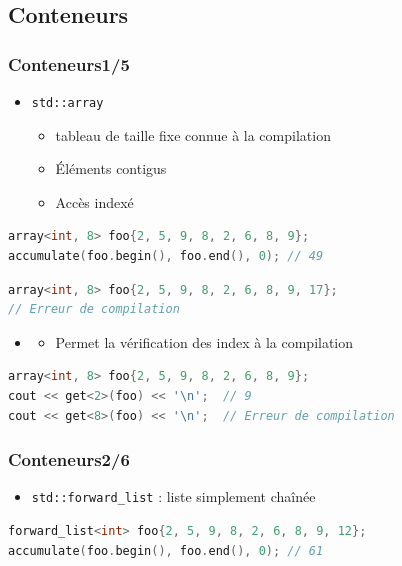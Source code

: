 \documentclass[C++.tex]{subfiles}
\begin{document}
\subsection*{Conteneurs}
\begin{frame}[fragile]
	\frametitle{Conteneurs\titlehfill{}1/5}
	\begin{itemize}
		\item \lstinline|std::array|
		\begin{itemize}
			\item tableau de taille fixe connue à la compilation
			\item Éléments contigus
			\item Accès indexé
		\end{itemize}
	\end{itemize}

	\begin{lstlisting}[language=C++]
array<int, 8> foo{2, 5, 9, 8, 2, 6, 8, 9};
accumulate(foo.begin(), foo.end(), 0); // 49\end{lstlisting}

	\begin{lstlisting}[language=C++]
array<int, 8> foo{2, 5, 9, 8, 2, 6, 8, 9, 17};
// Erreur de compilation\end{lstlisting}

\begin{itemize}
	\item[]\begin{itemize}
		\item Permet la vérification des index à la compilation
	\end{itemize}
\end{itemize}


		\begin{lstlisting}[language=C++]
array<int, 8> foo{2, 5, 9, 8, 2, 6, 8, 9};
cout << get<2>(foo) << '\n';  // 9
cout << get<8>(foo) << '\n';  // Erreur de compilation\end{lstlisting}
\end{frame}

\begin{frame}[fragile]
\frametitle{Conteneurs\titlehfill{}2/6}
	\begin{itemize}
		\item \lstinline|std::forward_list| : liste simplement chaînée
	\end{itemize}

	\begin{lstlisting}[language=C++]
forward_list<int> foo{2, 5, 9, 8, 2, 6, 8, 9, 12};
accumulate(foo.begin(), foo.end(), 0); // 61\end{lstlisting}
\end{frame}
\end{document}
